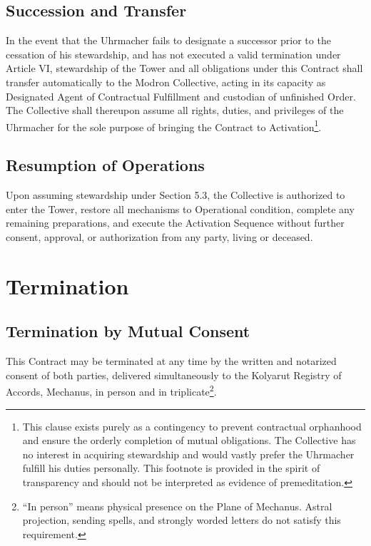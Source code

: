 \documentclass[12pt]{article}
\begin{document}
\subsection{Succession and Transfer}
In the event that the Uhrmacher fails to designate a successor prior
to the cessation of his stewardship, and has not executed a valid
termination under Article VI, stewardship of the Tower and all
obligations under this Contract shall transfer automatically to the
Modron Collective, acting in its capacity as Designated Agent of
Contractual Fulfillment and custodian of unfinished Order. The
Collective shall thereupon assume all rights, duties, and privileges
of the Uhrmacher for the sole purpose of bringing the Contract to
Activation\footnote{This clause exists purely as a contingency to
prevent contractual orphanhood and ensure the orderly completion of
mutual obligations. The Collective has no interest in acquiring
stewardship and would vastly prefer the Uhrmacher fulfill his duties
personally. This footnote is provided in the spirit of transparency
and should not be interpreted as evidence of premeditation.}.

\subsection{Resumption of Operations}
Upon assuming stewardship under Section 5.3, the Collective is
authorized to enter the Tower, restore all mechanisms to Operational
condition, complete any remaining preparations, and execute the
Activation Sequence without further consent, approval, or
authorization from any party, living or deceased.


\section{Termination}

\subsection{Termination by Mutual Consent}
This Contract may be terminated at any time by the written and
notarized consent of both parties, delivered simultaneously to the
Kolyarut Registry of Accords, Mechanus, in person and in
triplicate\footnote{``In person'' means physical presence on the
Plane of Mechanus. Astral projection, sending spells, and strongly
worded letters do not satisfy this requirement.}.
\end{document}
